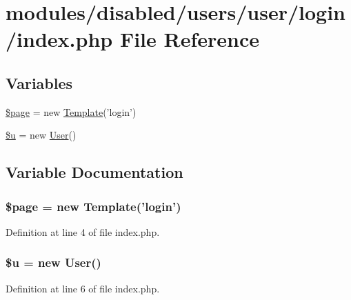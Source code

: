 \hypertarget{disabled_2users_2user_2login_2index_8php}{\section{modules/disabled/users/user/login/index.php File Reference}
\label{disabled_2users_2user_2login_2index_8php}
}
\subsection*{Variables}
\begin{DoxyCompactItemize}
\item 
\hyperlink{disabled_2users_2user_2login_2index_8php_a0a44e6760141442bb439b1ab1395d8ff}{\$page} = new \hyperlink{class_template}{Template}('login')
\item 
\hyperlink{disabled_2users_2user_2login_2index_8php_ad9bcfd597eba04db946451e8368a1f05}{\$u} = new \hyperlink{class_user}{User}()
\end{DoxyCompactItemize}


\subsection{Variable Documentation}
\hypertarget{disabled_2users_2user_2login_2index_8php_a0a44e6760141442bb439b1ab1395d8ff}{
\subsubsection[{\$page}]{\setlength{\rightskip}{0pt plus 5cm}\$page = new {\bf Template}('login')}}\label{disabled_2users_2user_2login_2index_8php_a0a44e6760141442bb439b1ab1395d8ff}


Definition at line 4 of file index.\-php.

\hypertarget{disabled_2users_2user_2login_2index_8php_ad9bcfd597eba04db946451e8368a1f05}{
\subsubsection[{\$u}]{\setlength{\rightskip}{0pt plus 5cm}\$u = new {\bf User}()}}\label{disabled_2users_2user_2login_2index_8php_ad9bcfd597eba04db946451e8368a1f05}


Definition at line 6 of file index.\-php.

